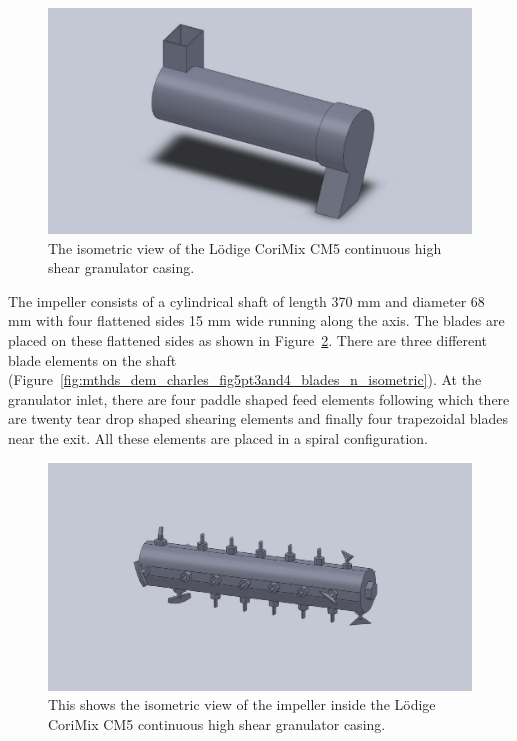 \documentclass[preprint,11pt,authoryear]{elsarticle}
\begin{document}
\begin{figure}
\centering
\includegraphics[scale=0.15]{shell_final_pic.pdf}
\caption{The isometric view of the L\"{o}dige CoriMix CM5 continuous high shear granulator casing.}
\label{fig:mthdsDemCharlesGranShell}
\end{figure}

The impeller consists of a cylindrical shaft of length 370 mm and diameter 68 mm with four 
flattened sides 15 mm wide running along the axis. The blades are placed on these flattened sides as 
shown in Figure~\ref{fig:mthds_dem_charles_impeller}. There are three different blade elements on the 
shaft (Figure~\ref{fig:mthds_dem_charles_fig5pt3and4_blades_n_isometric}). At the granulator inlet, 
there are four paddle shaped feed elements following which there are twenty tear drop shaped shearing 
elements  and finally four trapezoidal blades near the exit. All these elements are placed in 
a spiral configuration. 

\begin{figure}
\centering
\includegraphics[scale=0.15]{impeller_final_pic.pdf}
\caption{This shows the isometric view of the impeller inside the L\"{o}dige CoriMix CM5 continuous 
high shear granulator casing.}
\label{fig:mthds_dem_charles_impeller}
\end{figure}    
\end{document}
